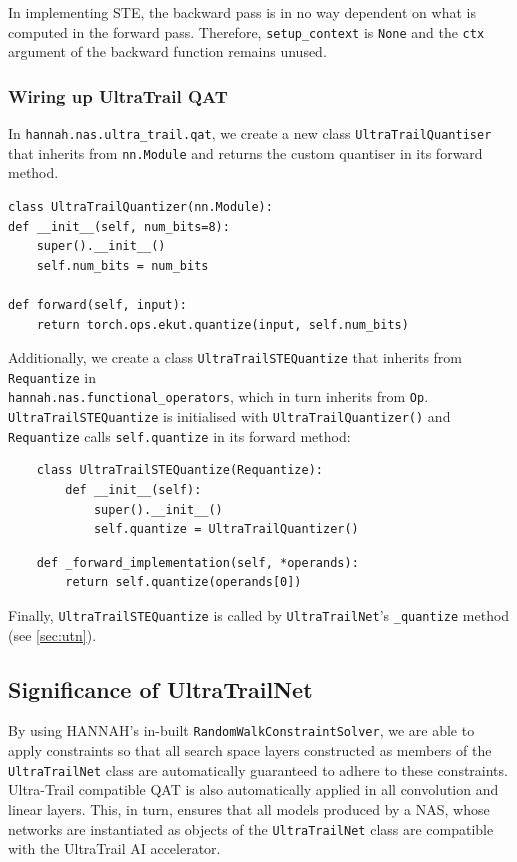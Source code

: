 \documentclass[11pt,a4paper, open=any]{scrbook}
\newcounter{constraint}[chapter]
\newcommand{\py}[1]{\texttt{#1}}
\begin{document}
In implementing STE, the backward pass is in no way dependent on what is computed in the forward pass. Therefore, \py{setup_context} is \py{None} and the \py{ctx} argument of the backward function remains unused.

\subsubsection{Wiring up UltraTrail QAT}
In \py{hannah.nas.ultra_trail.qat}, we create a new class \py{UltraTrailQuantiser} that inherits from \py{nn.Module}
and returns the custom quantiser in its forward method.

\begin{verbatim}
class UltraTrailQuantizer(nn.Module):
def __init__(self, num_bits=8):
	super().__init__()
	self.num_bits = num_bits

def forward(self, input):
	return torch.ops.ekut.quantize(input, self.num_bits)
\end{verbatim} 

Additionally, we create a class \py{UltraTrailSTEQuantize} that inherits from \py{Requantize} in\\ \py{hannah.nas.functional_operators}, which in turn inherits from \py{Op}. \py{UltraTrailSTEQuantize} is initialised with  \py{UltraTrailQuantizer()} and \py{Requantize} calls \py{self.quantize} in its forward method:

\begin{verbatim}
	class UltraTrailSTEQuantize(Requantize):
		def __init__(self):
			super().__init__()
			self.quantize = UltraTrailQuantizer()
\end{verbatim}

\begin{verbatim}
	def _forward_implementation(self, *operands):
		return self.quantize(operands[0])
\end{verbatim}

Finally, \py{UltraTrailSTEQuantize} is called by \py{UltraTrailNet}'s \py{_quantize} method (see \ref{sec:utn}).

\subsection{Significance of UltraTrailNet}
By using HANNAH's in-built \py{RandomWalkConstraintSolver}, we are able to apply constraints so that all search space layers constructed as members of the \py{UltraTrailNet} class are automatically guaranteed to adhere to these constraints. Ultra-Trail compatible QAT is also automatically applied in all convolution and linear layers. This, in turn, ensures that all models produced by a NAS, whose networks are instantiated as objects of the \py{UltraTrailNet} class are compatible with the UltraTrail AI accelerator.
\end{document}
